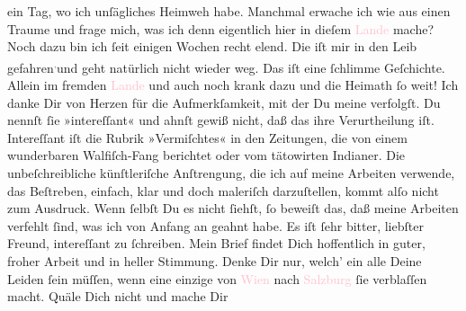                ein Tag, wo ich unſägliches Heimweh habe. Manchmal erwache ich wie aus einen Traume
               und frage\strikeout{,} mich, was ich denn eigentlich hier in
               dieſem \textcolor{pink}{Lande}{} mache? Noch dazu
               bin ich ſeit einigen Wochen recht elend. Die \label{K_L02858-3v}\label{K_L02858-3h} iſt mir in den
               Leib gefahren\substVorne{}\textsuperscript{\textcolor{gray}{,}}\substDazwischen{}und\substHinten{} geht natürlich nicht wieder weg. Das iſt eine ſchlimme Geſchichte. Allein im
               fremden \textcolor{pink}{Lande}{} und auch noch
               krank dazu und die Heimath ſo weit!{\dotsfive}\pend
           \pstart
           {\pb}Ich danke Dir von Herzen für die Aufmerkſamkeit,
               mit der Du meine \label{K_L02858-4v}\label{K_L02858-4h} verfolgſt. Du nennſt ſie
               »intereſſant« und ahnſt gewiß nicht, daß das ihre Verurtheilung iſt. Intereſſant iſt
               die Rubrik »Vermiſchtes« in den Zeitungen, die von einem wunderbaren Walfiſch-Fang
               berichtet oder vom tätowirten Indianer. Die unbeſchreibliche künſtleriſche
               Anſtrengung, die ich auf meine Arbeiten verwende, das Beſtreben, einfach, klar und
               doch maleriſch darzuſtellen, {\pb}kommt alſo nicht zum
               Ausdruck. Wenn ſelbſt Du es nicht ſiehſt, ſo beweiſt das, daß meine Arbeiten verfehlt
               ſind, was ich von Anfang an \strikeout{\textcolor{gray}{×}\-\textcolor{gray}{×}\-\textcolor{gray}{×}\-\textcolor{gray}{×}\-\textcolor{gray}{×}\-\textcolor{gray}{×}\-\textcolor{gray}{×}} geahnt habe. Es iſt ſehr bitter, liebſter Freund, intereſſant zu
               ſchreiben.\pend
           \pstart
           Mein Brief findet Dich hoffentlich in guter, froher Arbeit und in heller Stimmung.
               Denke Dir nur, welch’ ein \label{K_L02858-6v}\label{K_L02858-6h}{ } alle Deine Leiden ſein müſſen, {\pb}wenn eine einzige \label{K_L02858-8v}\label{K_L02858-8h} von \textcolor{pink}{Wien}{}\ledrightnote{\textcolor{pink}{Wien}} nach \textcolor{pink}{Salzburg}{}\ledrightnote{\textcolor{pink}{Salzburg}} ſie verblaſſen macht. Quäle Dich nicht und mache Dir
